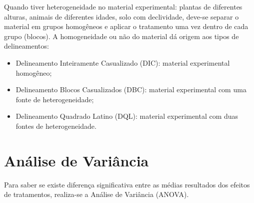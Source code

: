 \documentclass[12pt,brazil,oneside]{book}
\begin{document}
Quando tiver heterogeneidade no material experimental: plantas de diferentes alturas, animais de diferentes idades, solo com declividade, deve-se separar o material em grupos homogêneos
e aplicar o tratamento uma vez dentro de cada grupo (blocos).
A homogeneidade ou não do material dá origem aos tipos de delineamentos:

\begin{itemize}
\item
  Delineamento Inteiramente Casualizado (DIC): material experimental homogêneo;
\item
  Delineamento Blocos Casualizados (DBC): material experimental com uma fonte de heterogeneidade;
\item
  Delineamento Quadrado Latino (DQL): material experimental com duas fontes de heterogeneidade.
\end{itemize}

\hypertarget{analise-de-variancia}{%
\section{Análise de Variância}\label{analise-de-variancia}}

Para saber se existe diferença significativa entre as médias resultados dos efeitos de tratamentos, realiza-se a Análise de Variância (ANOVA).
\end{document}

